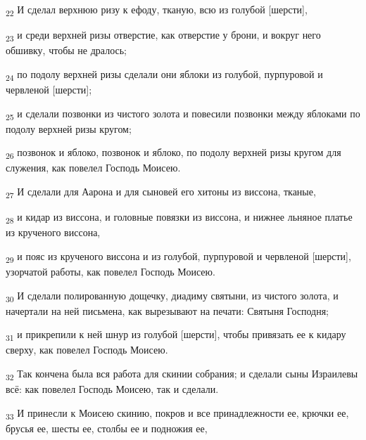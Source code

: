 \begin{tcolorbox}
\textsubscript{22} И сделал верхнюю ризу к ефоду, тканую, всю из голубой [шерсти],
\end{tcolorbox}
\begin{tcolorbox}
\textsubscript{23} и среди верхней ризы отверстие, как отверстие у брони, и вокруг него обшивку, чтобы не дралось;
\end{tcolorbox}
\begin{tcolorbox}
\textsubscript{24} по подолу верхней ризы сделали они яблоки из голубой, пурпуровой и червленой [шерсти];
\end{tcolorbox}
\begin{tcolorbox}
\textsubscript{25} и сделали позвонки из чистого золота и повесили позвонки между яблоками по подолу верхней ризы кругом;
\end{tcolorbox}
\begin{tcolorbox}
\textsubscript{26} позвонок и яблоко, позвонок и яблоко, по подолу верхней ризы кругом для служения, как повелел Господь Моисею.
\end{tcolorbox}
\begin{tcolorbox}
\textsubscript{27} И сделали для Аарона и для сыновей его хитоны из виссона, тканые,
\end{tcolorbox}
\begin{tcolorbox}
\textsubscript{28} и кидар из виссона, и головные повязки из виссона, и нижнее льняное платье из крученого виссона,
\end{tcolorbox}
\begin{tcolorbox}
\textsubscript{29} и пояс из крученого виссона и из голубой, пурпуровой и червленой [шерсти], узорчатой работы, как повелел Господь Моисею.
\end{tcolorbox}
\begin{tcolorbox}
\textsubscript{30} И сделали полированную дощечку, диадиму святыни, из чистого золота, и начертали на ней письмена, как вырезывают на печати: Святыня Господня;
\end{tcolorbox}
\begin{tcolorbox}
\textsubscript{31} и прикрепили к ней шнур из голубой [шерсти], чтобы привязать ее к кидару сверху, как повелел Господь Моисею.
\end{tcolorbox}
\begin{tcolorbox}
\textsubscript{32} Так кончена была вся работа для скинии собрания; и сделали сыны Израилевы всё: как повелел Господь Моисею, так и сделали.
\end{tcolorbox}
\begin{tcolorbox}
\textsubscript{33} И принесли к Моисею скинию, покров и все принадлежности ее, крючки ее, брусья ее, шесты ее, столбы ее и подножия ее,
\end{tcolorbox}
